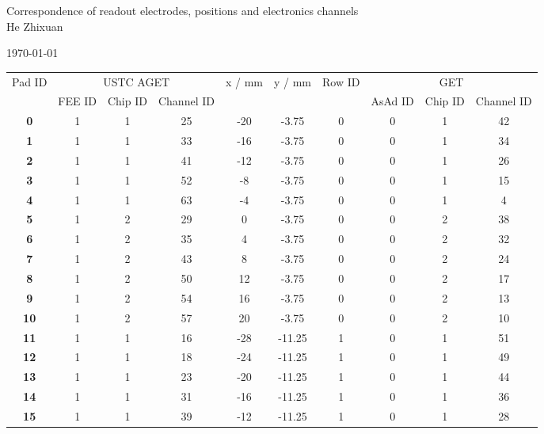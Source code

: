 \documentclass[12pt,letterpaper, onecolumn]{exam}
\begin{document}
\begingroup  
    \centering
    \LARGE Correspondence of readout electrodes, positions and electronics channels\\
    \large He Zhixuan\par
    \large \today\\[0.5em]

\endgroup
\begin{longtable}{cccccccccc}
    
    \hline
    \multirow{2}{*}{\scriptsize{Pad ID}} & \multicolumn{3}{c}{{USTC AGET}} & \multirow{2}{*}{\scriptsize{x / mm}} & \multirow{2}{*}{\scriptsize{y / mm}} & \multirow{2}{*}{\scriptsize{Row ID}} & \multicolumn{3}{c}{{GET}} \\   \cline{2-4} \cline{8-10}

      & \scriptsize{FEE ID} & \scriptsize{Chip ID} & \scriptsize{Channel ID} &  &  &  & \scriptsize{AsAd ID} & \scriptsize{Chip ID} & \scriptsize{Channel ID} \\   \hline
    \textbf{0} & 1 & 1 & 25 & -20 & -3.75 & 0 & 0 & 1 & 42 \\ 
    \textbf{1} & 1 & 1 & 33 & -16 & -3.75 & 0 & 0 & 1 & 34 \\ 
    \textbf{2} & 1 & 1 & 41 & -12 & -3.75 & 0 & 0 & 1 & 26 \\ 
    \textbf{3} & 1 & 1 & 52 & -8 & -3.75 & 0 & 0 & 1 & 15 \\ 
    \textbf{4} & 1 & 1 & 63 & -4 & -3.75 & 0 & 0 & 1 & 4 \\ 
    \textbf{5} & 1 & 2 & 29 & 0 & -3.75 & 0 & 0 & 2 & 38 \\ 
    \textbf{6} & 1 & 2 & 35 & 4 & -3.75 & 0 & 0 & 2 & 32 \\ 
    \textbf{7} & 1 & 2 & 43 & 8 & -3.75 & 0 & 0 & 2 & 24 \\ 
    \textbf{8} & 1 & 2 & 50 & 12 & -3.75 & 0 & 0 & 2 & 17 \\ 
    \textbf{9} & 1 & 2 & 54 & 16 & -3.75 & 0 & 0 & 2 & 13 \\ 
    \textbf{10} & 1 & 2 & 57 & 20 & -3.75 & 0 & 0 & 2 & 10 \\ 
    \textbf{11} & 1 & 1 & 16 & -28 & -11.25 & 1 & 0 & 1 & 51 \\ 
    \textbf{12} & 1 & 1 & 18 & -24 & -11.25 & 1 & 0 & 1 & 49 \\ 
    \textbf{13} & 1 & 1 & 23 & -20 & -11.25 & 1 & 0 & 1 & 44 \\ 
    \textbf{14} & 1 & 1 & 31 & -16 & -11.25 & 1 & 0 & 1 & 36 \\ 
    \textbf{15} & 1 & 1 & 39 & -12 & -11.25 & 1 & 0 & 1 & 28 \\ 

\end{longtable}
\end{document}
